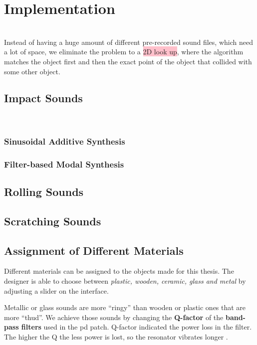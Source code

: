 \chapter{Implementation}\label{ch:implementation}

\\


Instead of having a huge amount of different pre-recorded sound files, which need a lot of space, we eliminate the problem to a \colorbox{pink}{2D look up}, where the algorithm matches the object first and then the exact point of the object that collided with some other object.


\section{Impact Sounds}
\\

\subsection{Sinusoidal Additive Synthesis}

\subsection{Filter-based Modal Synthesis}

\section{Rolling Sounds}

\section{Scratching Sounds}

\section{Assignment of Different Materials}
Different materials can be assigned to the objects made for this thesis. The designer is able to choose between \textit{plastic, wooden, ceramic, glass and metal} by adjusting a slider on the interface. 

Metallic or glass sounds are more ``ringy'' than wooden or plastic ones that are more ``thud''. We achieve those sounds by changing the \textbf{Q-factor} of the \textbf{band-pass filters} used in the pd patch. Q-factor indicated the power loss in the filter. The higher the Q the less power is lost, so the resonator vibrates longer \cite{bib:Q}.

